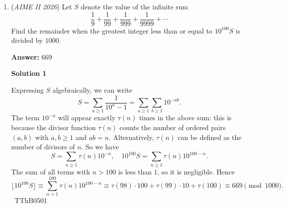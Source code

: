 \begin{enumerate}
 Note that we must have some rational root, since we need $\frac{AB}{BC}$ to be rational. Also, the motivation for substitution is to simplify the cubic, so Rational Root theorem is simpler. Motivation for me was that I can calculate cubics faster for integers inputs, rather than fractions.

 



\textbf{Solution 3 (Guess & Check)}

Clearly, $AB$ and $AC$ must make up most of triangle $\triangle ABC$'s perimeter. We can set the perimeter of triangle $\triangle ABC$ to $125x,$ and the perimeter of triangle $\triangle AIC$ to $6x.$ We do not need to check many values of $x,$ because if $x$ was too large then side $AB$ would be greater than $1000.$ After checking values of $x,$ we can find that the value $x=4$ works if side $AB$ is $245,$ side $AC$ is $10,$ and side $IA=7.$ We can double check this by finding the inradius of triangle $\triangle ABC$ using the formula $\frac{A}{s},$ where $A$ is the area and $s$ is the semiperimeter. Using Heron's formula for the area, we can find that the inradius is equal to $\sqrt{24},$ or $2 \sqrt 6.$ If we draw the lines connecting the incircle to the sides of the triangle, we know that they form right angles with the sides from the tangent circle theorem. Using the Pythagorean Theorem on these sides, we can see that the side lengths do in fact work, giving us $AB=\boxed {245}$ as our answer.

 


	\item (\textit{AIME II 2026}) Let $S$ denote the value of the infinite sum
 \[\frac 19 + \frac 1{99} + \frac 1{999} + \frac 1{9999}  + \cdots\]Find the remainder when the greatest integer less than or equal to $10^{100} S$ is divided by $1000.$

 \textbf{Answer: }669



\textbf{Solution 1}

Expressing $S$ algebraically, we can write
 \[S=\sum_{a\ge1}\frac{1}{10^a-1}=\sum_{a\ge1}\sum_{b\ge1}10^{-ab}.\]The term $10^{-n}$ will appear exactly $\tau(n)$ times in the above sum: this is because the divisor function $\tau(n)$ counts the number of ordered pairs $(a,b)$ with $a,b\ge 1$ and $ab=n$. Alternatively, $\tau(n)$ can be defined as the number of divisors of $n$. So we have
 \[S=\sum_{n\ge 1}\tau(n)10^{-n},\quad10^{100}S = \sum_{n\ge 1}\tau(n)10^{100-n}.\]The sum of all terms with $n>100$ is less than $1$, so it is negligible. Hence
 \[\lfloor 10^{100}S\rfloor \equiv \sum_{n=1}^{100}\tau(n)10^{100-n}\equiv\tau(98)\cdot 100+\tau(99)\cdot 10+\tau(100)\equiv \boxed{669} \pmod{1000}.\]~TThB0501


\end{enumerate}
